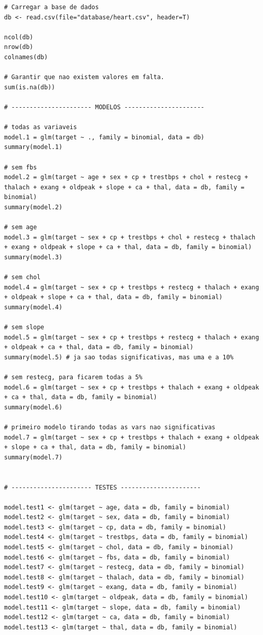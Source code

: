 \documentclass[a4paper]{report}
\begin{document}
\begin{lstlisting}[breaklines,basicstyle=\small]
# Carregar a base de dados
db <- read.csv(file="database/heart.csv", header=T)

ncol(db)
nrow(db)
colnames(db)

# Garantir que nao existem valores em falta.
sum(is.na(db))

# ---------------------- MODELOS ----------------------

# todas as variaveis
model.1 = glm(target ~ ., family = binomial, data = db)
summary(model.1)

# sem fbs
model.2 = glm(target ~ age + sex + cp + trestbps + chol + restecg + thalach + exang + oldpeak + slope + ca + thal, data = db, family = binomial)
summary(model.2)

# sem age
model.3 = glm(target ~ sex + cp + trestbps + chol + restecg + thalach + exang + oldpeak + slope + ca + thal, data = db, family = binomial)
summary(model.3) 

# sem chol
model.4 = glm(target ~ sex + cp + trestbps + restecg + thalach + exang + oldpeak + slope + ca + thal, data = db, family = binomial)
summary(model.4)

# sem slope
model.5 = glm(target ~ sex + cp + trestbps + restecg + thalach + exang + oldpeak + ca + thal, data = db, family = binomial)
summary(model.5) # ja sao todas significativas, mas uma e a 10%

# sem restecg, para ficarem todas a 5%
model.6 = glm(target ~ sex + cp + trestbps + thalach + exang + oldpeak + ca + thal, data = db, family = binomial)
summary(model.6) 

# primeiro modelo tirando todas as vars nao significativas
model.7 = glm(target ~ sex + cp + trestbps + thalach + exang + oldpeak + slope + ca + thal, data = db, family = binomial)
summary(model.7)


# ---------------------- TESTES ----------------------

model.test1 <- glm(target ~ age, data = db, family = binomial)
model.test2 <- glm(target ~ sex, data = db, family = binomial)
model.test3 <- glm(target ~ cp, data = db, family = binomial)
model.test4 <- glm(target ~ trestbps, data = db, family = binomial)
model.test5 <- glm(target ~ chol, data = db, family = binomial)
model.test6 <- glm(target ~ fbs, data = db, family = binomial)
model.test7 <- glm(target ~ restecg, data = db, family = binomial)
model.test8 <- glm(target ~ thalach, data = db, family = binomial)
model.test9 <- glm(target ~ exang, data = db, family = binomial)
model.test10 <- glm(target ~ oldpeak, data = db, family = binomial)
model.test11 <- glm(target ~ slope, data = db, family = binomial)
model.test12 <- glm(target ~ ca, data = db, family = binomial)
model.test13 <- glm(target ~ thal, data = db, family = binomial)


\end{lstlisting}
\end{document}
